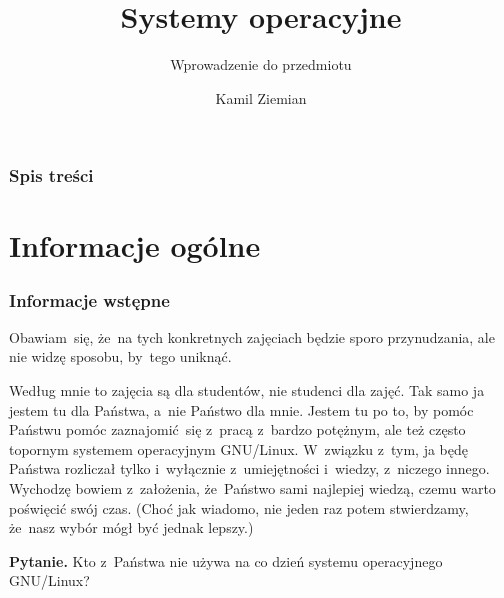 \documentclass[10pt,t]{beamer}
\title{Systemy operacyjne}
\subtitle{Wprowadzenie do przedmiotu}
\author{Kamil Ziemian \\
  \email}
\begin{document}





\RaggedRight





\maketitle





\begin{frame}
  \frametitle{Spis treści}


  \tableofcontents

\end{frame}





\section{Informacje ogólne}



\begin{frame}
  \frametitle{Informacje wstępne}


  Obawiam~się, że~na tych konkretnych zajęciach będzie sporo przynudzania,
  ale nie widzę sposobu, by~tego uniknąć.

  Według mnie to zajęcia są dla studentów, nie studenci dla zajęć. Tak samo
  ja jestem tu dla Państwa, a~nie Państwo dla mnie. Jestem tu po to, by
  pomóc Państwu pomóc zaznajomić~się z~pracą z~bardzo potężnym, ale też
  często topornym systemem operacyjnym GNU/Linux. W~związku z~tym,
  ja będę Państwa rozliczał tylko i~wyłącznie z~umiejętności i~wiedzy,
  z~niczego innego. Wychodzę bowiem z~założenia, że~Państwo sami najlepiej
  wiedzą, czemu warto poświęcić swój czas. (Choć jak wiadomo, nie jeden raz
  potem stwierdzamy, że~nasz wybór mógł być jednak lepszy.)

  \textbf{Pytanie.} Kto z~Państwa \alert{nie} używa na co dzień systemu
  operacyjnego GNU/Linux?

\end{frame}
\end{document}
